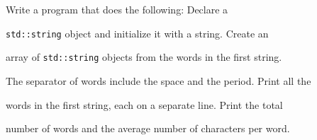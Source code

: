 Write a program that does the following: Declare a

\texttt{std::string} object and initialize it with a string. Create an

array of \texttt{std::string} objects from the words in the first string.

The separator of words include the space and the period. Print all the

words in the first string, each on a separate line. Print the total

number of words and the average number of characters per word.

